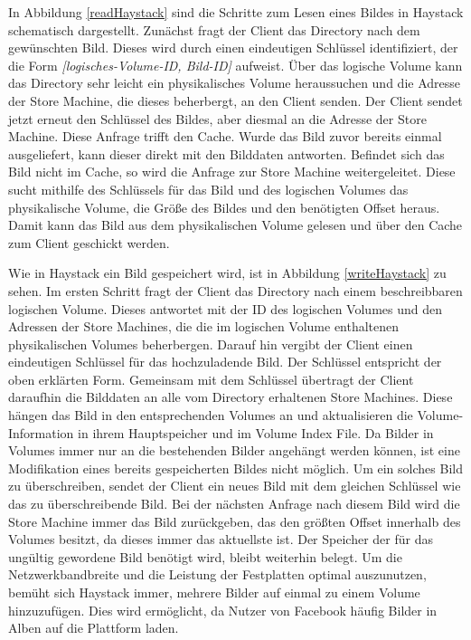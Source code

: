 \documentclass[12pt,oneside,a4paper,parskip]{scrbook}
\begin{document}
In Abbildung \ref{readHaystack} sind die Schritte zum Lesen eines Bildes in Haystack schematisch dargestellt. Zunächst fragt der Client das Directory nach dem gewünschten Bild. Dieses wird durch einen eindeutigen Schlüssel identifiziert, der die Form \textit{[logisches-Volume-ID, Bild-ID]} aufweist. Über das logische Volume kann das Directory sehr leicht ein physikalisches Volume heraussuchen und die Adresse der Store Machine, die dieses beherbergt, an den Client senden. Der Client sendet jetzt erneut den Schlüssel des Bildes, aber diesmal an die Adresse der Store Machine. Diese Anfrage trifft den Cache. Wurde das Bild zuvor bereits einmal ausgeliefert, kann dieser direkt mit den Bilddaten antworten. Befindet sich das Bild nicht im Cache, so wird die Anfrage zur Store Machine weitergeleitet. Diese sucht mithilfe des Schlüssels für das Bild und des logischen Volumes das physikalische Volume, die Größe des Bildes und den benötigten Offset heraus. Damit kann das Bild aus dem physikalischen Volume gelesen und über den Cache zum Client geschickt werden. 

Wie in Haystack ein Bild gespeichert wird, ist in Abbildung \ref{writeHaystack} zu sehen. Im ersten Schritt fragt der Client das Directory nach einem beschreibbaren logischen Volume. Dieses antwortet mit der ID des logischen Volumes und den Adressen der Store Machines, die die im logischen Volume enthaltenen physikalischen Volumes beherbergen. Darauf hin vergibt der Client einen eindeutigen Schlüssel für das hochzuladende Bild. Der Schlüssel entspricht der oben erklärten Form. Gemeinsam mit dem Schlüssel übertragt der Client daraufhin die Bilddaten an alle vom Directory erhaltenen Store Machines. Diese hängen das Bild in den entsprechenden Volumes an und aktualisieren die Volume-Information in ihrem Hauptspeicher und im Volume Index File. Da Bilder in Volumes immer nur an die bestehenden Bilder angehängt werden können, ist eine Modifikation eines bereits gespeicherten Bildes nicht möglich. Um ein solches Bild zu überschreiben, sendet der Client ein neues Bild mit dem gleichen Schlüssel wie das zu überschreibende Bild. Bei der nächsten Anfrage nach diesem Bild wird die Store Machine immer das Bild zurückgeben, das den größten Offset innerhalb des Volumes besitzt, da dieses immer das aktuellste ist. Der Speicher der für das ungültig gewordene Bild benötigt wird, bleibt weiterhin belegt. Um die Netzwerkbandbreite und die Leistung der Festplatten optimal auszunutzen, bemüht sich Haystack immer, mehrere Bilder auf einmal zu einem Volume hinzuzufügen. Dies wird ermöglicht, da Nutzer von Facebook häufig Bilder in Alben auf die Plattform laden.
\end{document}
